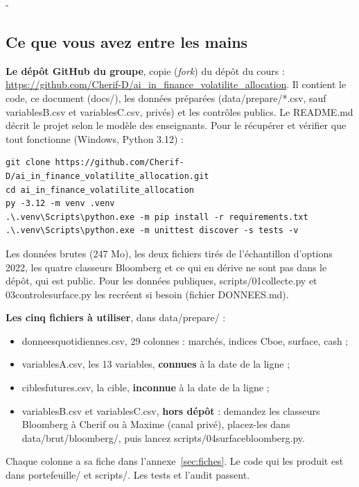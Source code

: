 \documentclass[10pt,a4paper]{article}
\makeatletter
\newcommand{\besoin}[1]{\par\penalty-100\begingroup\setlength{\dimen@}{#1}%
  \dimen@ii\pagegoal\advance\dimen@ii-\pagetotal
  \ifdim\dimen@>\dimen@ii\ifdim\dimen@ii>\z@\vfil\fi\break\fi\endgroup}
\let\soussectionorigine\subsection
\renewcommand{\subsection}{\besoin{5\baselineskip}\soussectionorigine}
\newcommand{\coupure}{\textunderscore\allowbreak}
\newcommand{\fic}[1]{{\small\ttfamily\let\_\coupure #1}}
\makeatother
\begin{document}
\subsection{Ce que vous avez entre les mains}
\textbf{Le dépôt GitHub du groupe}, copie (\emph{fork}) du dépôt du cours : \url{https://github.com/Cherif-D/ai_in_finance_volatilite_allocation}. Il contient le code, ce document (\fic{docs/}), les données préparées (\fic{data/prepare/*.csv}, sauf \fic{variables\_B.csv} et \fic{variables\_C.csv}, privés) et les contrôles publics. Le \fic{README.md} décrit le projet selon le modèle des enseignants. Pour le récupérer et vérifier que tout fonctionne (Windows, Python 3.12) :
\begin{verbatim}
git clone https://github.com/Cherif-D/ai_in_finance_volatilite_allocation.git
cd ai_in_finance_volatilite_allocation
py -3.12 -m venv .venv
.\.venv\Scripts\python.exe -m pip install -r requirements.txt
.\.venv\Scripts\python.exe -m unittest discover -s tests -v
\end{verbatim}
Les données brutes (247 Mo), les deux fichiers tirés de l'échantillon d'options 2022, les quatre classeurs Bloomberg et ce qui en dérive ne sont pas dans le dépôt, qui est public. Pour les données publiques, \fic{scripts/01\_collecte.py} et \fic{03\_controle\_surface.py} les recréent si besoin (fichier \fic{DONNEES.md}).

\textbf{Les cinq fichiers à utiliser}, dans \fic{data/prepare/} :
\begin{itemize}[nosep]
\item \fic{donnees\_quotidiennes.csv}, 29 colonnes : marchés, indices Cboe, surface, cash ;
\item \fic{variables\_A.csv}, les 13 variables, \textbf{connues} à la date de la ligne ;
\item \fic{cibles\_futures.csv}, la cible, \textbf{inconnue} à la date de la ligne ;
\item \fic{variables\_B.csv} et \fic{variables\_C.csv}, \textbf{hors dépôt} : demandez les classeurs Bloomberg à Cherif ou à Maxime (canal privé), placez-les dans \fic{data/brut/bloomberg/}, puis lancez \fic{scripts/04\_surface\_bloomberg.py}.
\end{itemize}
Chaque colonne a sa fiche dans l'annexe~\ref{sec:fiches}. Le code qui les produit est dans \fic{portefeuille/} et \fic{scripts/}. Les tests et l'audit passent.
\end{document}
